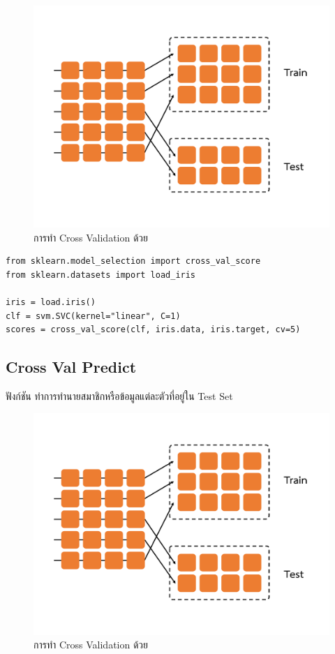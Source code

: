 \begin{figure}[H]
    \centering
    \includegraphics[width=0.9\linewidth,page=2]{fig/cross_validation.pdf}
    \caption{การทำ Cross Validation ด้วย }
    \label{fig:cross_val_score}
\end{figure}

\begin{lstlisting}[style=MyPython]
from sklearn.model_selection import cross_val_score
from sklearn.datasets import load_iris

iris = load.iris()
clf = svm.SVC(kernel="linear", C=1)
scores = cross_val_score(clf, iris.data, iris.target, cv=5)
\end{lstlisting}

\subsection{Cross Val Predict}
\label{ssec:cross_val_predict}

ฟังก์ชัน  ทำการทำนายสมาชิกหรือข้อมูลแต่ละตัวที่อยู่ใน Test Set

\begin{figure}[H]
    \centering
    \includegraphics[width=0.9\linewidth,page=3]{fig/cross_validation.pdf}
    \caption{การทำ Cross Validation ด้วย }
    \label{fig:cross_val_predict}
\end{figure}

